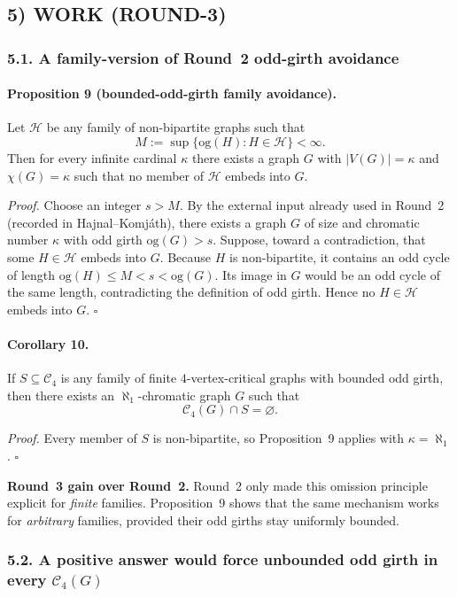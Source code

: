 \subsection*{5) WORK (ROUND-3)}

\subsubsection*{5.1. A family-version of Round~2 odd-girth avoidance}

\paragraph{Proposition 9 (bounded-odd-girth family avoidance).}
Let $\mathcal H$ be any family of non-bipartite graphs such that
\[
M:=\sup\{\mathrm{og}(H):H\in \mathcal H\}<\infty.
\]
Then for every infinite cardinal $\kappa$ there exists a graph $G$ with $|V(G)|=\kappa$ and $\chi(G)=\kappa$ such that no member of $\mathcal H$ embeds into $G$.

\emph{Proof.}
Choose an integer $s>M$. By the external input already used in Round~2 (recorded in Hajnal--Komj\'ath), there exists a graph $G$ of size and chromatic number $\kappa$ with odd girth $\mathrm{og}(G)>s$.
Suppose, toward a contradiction, that some $H\in \mathcal H$ embeds into $G$.
Because $H$ is non-bipartite, it contains an odd cycle of length $\mathrm{og}(H)\le M < s < \mathrm{og}(G)$.
Its image in $G$ would be an odd cycle of the same length, contradicting the definition of odd girth.
Hence no $H\in \mathcal H$ embeds into $G$.
\hfill$\square$

\paragraph{Corollary 10.}
If $S\subseteq \mathcal C_4$ is any family of finite $4$-vertex-critical graphs with bounded odd girth, then there exists an $\aleph_1$-chromatic graph $G$ such that
\[
\mathcal C_4(G)\cap S=\varnothing.
\]

\emph{Proof.}
Every member of $S$ is non-bipartite, so Proposition~9 applies with $\kappa=\aleph_1$.
\hfill$\square$

\medskip
\noindent\textbf{Round~3 gain over Round~2.}
Round~2 only made this omission principle explicit for \emph{finite} families. Proposition~9 shows that the same mechanism works for \emph{arbitrary} families, provided their odd girths stay uniformly bounded.

\subsubsection*{5.2. A positive answer would force unbounded odd girth in every $\mathcal C_4(G)$}

